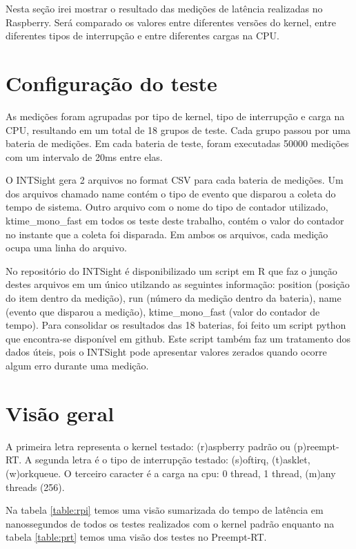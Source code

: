 
Nesta seção irei mostrar o resultado das medições de latência realizadas no Raspberry. Será comparado os valores entre diferentes versões do kernel, entre diferentes tipos de interrupção e entre diferentes cargas na CPU.

\section{Configuração do teste}

As medições foram agrupadas por tipo de kernel, tipo de interrupção e carga na CPU, resultando em um total de 18 grupos de teste. Cada grupo passou por uma bateria de medições. Em cada bateria de teste, foram executadas 50000 medições com um intervalo de 20ms entre elas. 

O INTSight gera 2 arquivos no format CSV para cada bateria de medições. Um dos arquivos chamado name contém o tipo de evento que disparou a coleta do tempo de sistema. Outro arquivo com o nome do tipo de contador utilizado, ktime\_mono\_fast em todos os teste deste trabalho, contém o valor do contador no instante que a coleta foi disparada. Em ambos os arquivos, cada medição ocupa uma linha do arquivo.

No repositório do INTSight é disponibilizado um script em R que faz o junção destes arquivos em um único utilzando as seguintes informação: position (posição do item dentro da medição), run (número da medição dentro da bateria), name (evento que disparou a medição), ktime\_mono\_fast (valor do contador de tempo). Para consolidar os resultados das 18 baterias, foi feito um script python que encontra-se disponível em github. Este script também faz um tratamento dos dados úteis, pois o INTSight pode apresentar valores zerados quando ocorre algum erro durante uma medição.

\section{Visão geral}

A primeira letra representa o kernel testado: (r)aspberry padrão ou (p)reempt-RT.
A segunda letra é o tipo de interrupção testado: (s)oftirq, (t)asklet, (w)orkqueue.
O terceiro caracter é a carga na cpu: 0 thread, 1 thread, (m)any threads (256).

Na tabela \ref{table:rpi} temos uma visão sumarizada do tempo de latência em nanossegundos de todos os testes realizados com o kernel padrão enquanto na tabela \ref{table:prt} temos uma visão dos testes no Preempt-RT.

